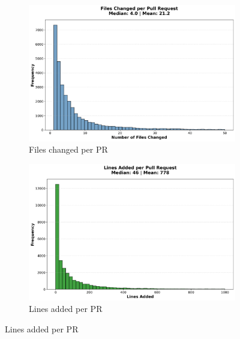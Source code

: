 \documentclass[11pt]{article}
\begin{document}
\begin{figure}[H]
\centering
\begin{subfigure}[b]{0.48\textwidth}
\centering
\includegraphics[width=\textwidth]{figures_individual/01_pr_files_changed_histogram.png}
\caption{Files changed per PR}
\label{fig:pr_files}
\end{subfigure}
\hfill
\begin{subfigure}[b]{0.48\textwidth}
\centering
\includegraphics[width=\textwidth]{figures_individual/04_pr_lines_added_histogram.png}
\caption{Lines added per PR}
\label{fig:pr_added}
\end{subfigure}

\vspace{0.3cm}


\end{figure}
\end{document}
